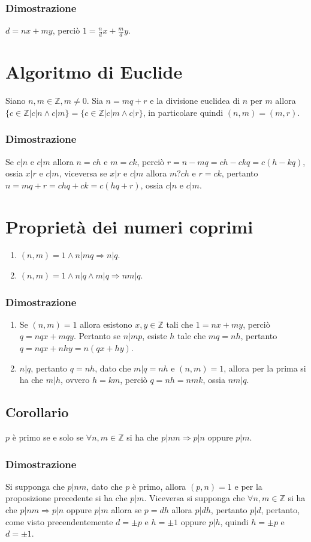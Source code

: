 \subsubsection{Dimostrazione}
$d=nx+my$, perci\`o $1=\frac{n}{d}x+\frac{m}{d}y$.
\section{Algoritmo di Euclide}
Siano $n,m\in\mathbb{Z}, m\neq 0$. Sia $n=mq+r$ e la divisione euclidea di $n$ per $m$ allora $\{c\in\mathbb{Z}|c|n\wedge c|m\}=\{c\in\mathbb{Z}|c|m\wedge c|r\}$, in particolare quindi $(n,m)=(m,r)$.
\subsubsection{Dimostrazione}
Se $c|n$ e $c|m$ allora $n=ch$ e $m=ck$, perci\`o $r=n-mq=ch-ckq=c(h-kq)$, ossia $x|r$ e $c|m$, viceversa se $x|r$ e $c|m$ allora $m?ch$ e $r=ck$, pertanto $n=mq+r=chq+ck=c(hq+r)$, ossia $c|n$ 
e $c|m$.
\section{Propriet\`a dei numeri coprimi}
\begin{enumerate}
\item $(n,m)=1\wedge n|mq\Rightarrow n|q$.
\item $(n,m)=1\wedge n|q\wedge m|q\Rightarrow nm|q$.
\end{enumerate}
\subsubsection{Dimostrazione}
\begin{enumerate}
\item Se $(n,m)=1$ allora esistono $x,y\in\mathbb{Z}$ tali che $1=nx+my$, perci\`o $q=nqx+mqy$. Pertanto se $n|mp$, esiste $h$ tale che $mq=nh$, pertanto $q=nqx+nhy=n(qx+hy)$.
\item $n|q$, pertanto $q=nh$, dato che $m|q=nh$ e $(n,m)=1$, allora per la prima si ha che $m|h$, ovvero $h=km$, perci\`o $q=nh=nmk$, ossia $nm|q$.
\end{enumerate}
\subsection{Corollario}
$p$ \`e primo se e solo se $\forall n,m\in\mathbb{Z}$ si ha che $p|nm\Rightarrow p|n$ oppure $p|m$.
\subsubsection{Dimostrazione}
Si supponga che $p|nm$, dato che $p$ \`e primo, allora $(p,n)=1$ e per la proposizione precedente si ha che $p|m$. Viceversa si supponga che $\forall n,m\in\mathbb{Z}$ si ha che $p|nm\Rightarrow p|n$ 
oppure $p|m$ allora se $p=dh$ allora $p|dh$, pertanto $p|d$, pertanto, come visto precendentemente $d=\pm p$ e $h=\pm 1$ oppure $p|h$, quindi $h=\pm p$ e $d=\pm 1$.
